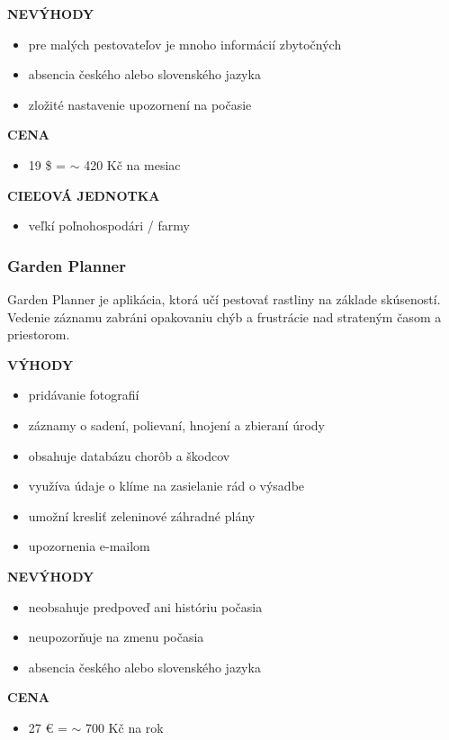\documentclass[twoside]{ctuthesis}
\theoremstyle{plain}
\theoremstyle{definition}
\theoremstyle{note}
\begin{document}
\textbf{NEVÝHODY}
\begin{itemize}
\item pre malých pestovateľov je mnoho informácií zbytočných
\item absencia českého alebo slovenského jazyka
\item zložité nastavenie upozornení na počasie
\end{itemize}

\textbf{CENA}
\begin{itemize}
\item 19 \$ = $\sim$ 420 Kč na mesiac 
\end{itemize}

\textbf{CIEĽOVÁ JEDNOTKA}
\begin{itemize}
\item veľkí poľnohospodári / farmy
\end{itemize}


\subsubsection*{Garden Planner}
Garden Planner je aplikácia, ktorá učí pestovať rastliny na základe skúseností. Vedenie záznamu zabráni opakovaniu chýb a frustrácie nad strateným časom a priestorom. \cite{planner}
\newline

\textbf{VÝHODY}
\begin{itemize}
\item pridávanie fotografií
\item záznamy o sadení, polievaní, hnojení a zbieraní úrody
\item obsahuje databázu chorôb a škodcov
\item využíva údaje o klíme na zasielanie rád o výsadbe
\item umožní kresliť zeleninové záhradné plány
\item upozornenia e-mailom
\end{itemize}

\textbf{NEVÝHODY}
\begin{itemize}
\item neobsahuje predpoveď ani históriu počasia
\item neupozorňuje na zmenu počasia
\item absencia českého alebo slovenského jazyka
\end{itemize}

\textbf{CENA}
\begin{itemize}
\item 27 € = $\sim$ 700 Kč na rok
\end{itemize}
\end{document}
